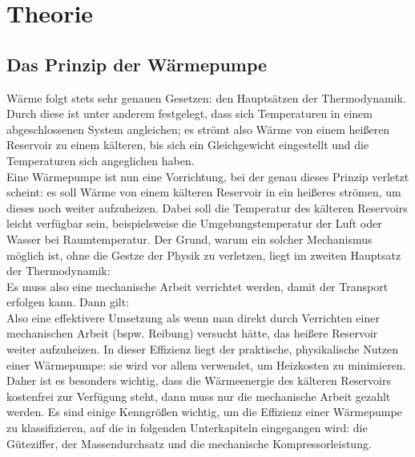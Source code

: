 \section{Theorie}
\label{sec:Theorie}

\subsection{Das Prinzip der Wärmepumpe}
Wärme folgt stets sehr genauen Gesetzen: den Hauptsätzen der Thermodynamik. Durch diese ist unter anderem festgelegt, dass sich Temperaturen in einem
abgeschlossenen System angleichen; es strömt also Wärme von einem heißeren Reservoir zu einem kälteren, bis sich ein Gleichgewicht eingestellt und 
die Temperaturen sich angeglichen haben. \\
Eine Wärmepumpe ist nun eine Vorrichtung, bei der genau dieses Prinzip verletzt scheint: es soll Wärme von einem kälteren Reservoir in ein heißeres
strömen, um dieses noch weiter aufzuheizen. Dabei soll die Temperatur des kälteren Reservoirs leicht verfügbar sein, beispielsweise die Umgebungstemperatur
der Luft oder Wasser bei Raumtemperatur. Der Grund, warum ein solcher Mechanismus möglich ist, ohne die Gestze der Physik zu verletzen, liegt im zweiten
Hauptsatz der Thermodynamik: \\
Es muss also eine mechanische Arbeit verrichtet werden, damit der Transport erfolgen kann. Dann gilt:\\
Also eine effektivere Umsetzung als wenn man direkt durch Verrichten einer mechanischen Arbeit (bspw. Reibung) versucht hätte, das heißere Reservoir weiter
aufzuheizen. In dieser Effizienz liegt der praktische, physikalische Nutzen einer Wärmepumpe: sie wird vor allem verwendet, um Heizkosten zu minimieren. 
Daher ist es besonders wichtig, dass die Wärmeenergie des kälteren Reservoirs kostenfrei zur Verfügung steht, dann muss nur die mechanische Arbeit gezahlt werden.
Es sind einige Kenngrößen wichtig, um die Effizienz einer Wärmepumpe zu klassifizieren, auf die in folgenden Unterkapiteln eingegangen wird: die Güteziffer,
der Massendurchsatz und die mechanische Kompressorleistung.\\

